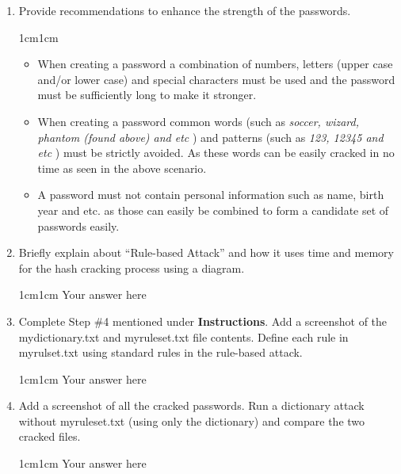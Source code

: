 \documentclass[11pt,letterpaper]{article}
\newenvironment{answer}{\em \color{blue} \begin{adjustwidth}{1cm}{1cm}}{\end{adjustwidth}}
\begin{document}
\begin{enumerate}
		\item Provide recommendations to enhance the strength of the passwords.
		
		\begin{answer}
		\begin{itemize}
			\item When creating a password a combination of numbers, letters (upper case and/or lower case)  and special characters must be used and the password must be sufficiently long to make it stronger.				
			
			\item When creating a password common words (such as \textit{soccer, wizard, phantom (found above)  and etc} ) and patterns (such as \textit{123, 12345 and etc} ) must be strictly avoided. As these words can be easily cracked in no time as seen in the above scenario.					
			
			\item A password must not contain personal information such as name, birth year and etc. as those can easily be combined to form a candidate set of passwords easily.
		\end{itemize}
		\end{answer}
		
		\item Briefly explain about ``Rule-based Attack'' and how it uses time and memory for the hash cracking process using a diagram.
		
		\begin{answer}
			Your answer here
		\end{answer}
		
		\item Complete Step \#4 mentioned under \textbf{Instructions}. Add a screenshot of the mydictionary.txt and myruleset.txt file contents. Define each rule in myrulset.txt using standard rules in the rule-based attack.
		
		\begin{answer}
			Your answer here
		\end{answer}
		
		\item Add a screenshot of all the cracked passwords. Run a dictionary attack without myruleset.txt (using only the dictionary) and compare the two cracked files.
		
		\begin{answer}
			Your answer here
		\end{answer}
		
	\end{enumerate}
	
\end{document}
